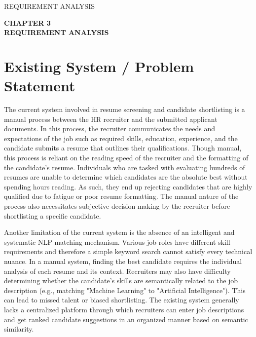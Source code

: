 \documentclass[12pt,a4paper]{report}
\begin{document}
\clearpage


{\protect\numberline{\thechapter}REQUIREMENT ANALYSIS}

\thispagestyle{empty}

\vspace*{\fill}

\begin{center}
    {\fontsize{14pt}{17pt}\selectfont\textbf{CHAPTER 3}}\\[1cm]
    {\fontsize{14pt}{17pt}\selectfont\textbf{REQUIREMENT ANALYSIS}}
\end{center}

\vspace*{\fill}

\clearpage

\section{Existing System / Problem Statement}
The current system involved in resume screening and candidate shortlisting is a manual process between the HR recruiter and the submitted applicant documents. In this process, the recruiter communicates the needs and expectations of the job such as required skills, education, experience, and the candidate submits a resume that outlines their qualifications. Though manual, this process is reliant on the reading speed of the recruiter and the formatting of the candidate's resume. Individuals who are tasked with evaluating hundreds of resumes are unable to determine which candidates are the absolute best without spending hours reading. As such, they end up rejecting candidates that are highly qualified due to fatigue or poor resume formatting. The manual nature of the process also necessitates subjective decision making by the recruiter before shortlisting a specific candidate.

Another limitation of the current system is the absence of an intelligent and systematic NLP matching mechanism. Various job roles have different skill requirements and therefore a simple keyword search cannot satisfy every technical nuance. In a manual system, finding the best candidate requires the individual analysis of each resume and its context. Recruiters may also have difficulty determining whether the candidate's skills are semantically related to the job description (e.g., matching "Machine Learning" to "Artificial Intelligence"). This can lead to missed talent or biased shortlisting. The existing system generally lacks a centralized platform through which recruiters can enter job descriptions and get ranked candidate suggestions in an organized manner based on semantic similarity.
\end{document}
